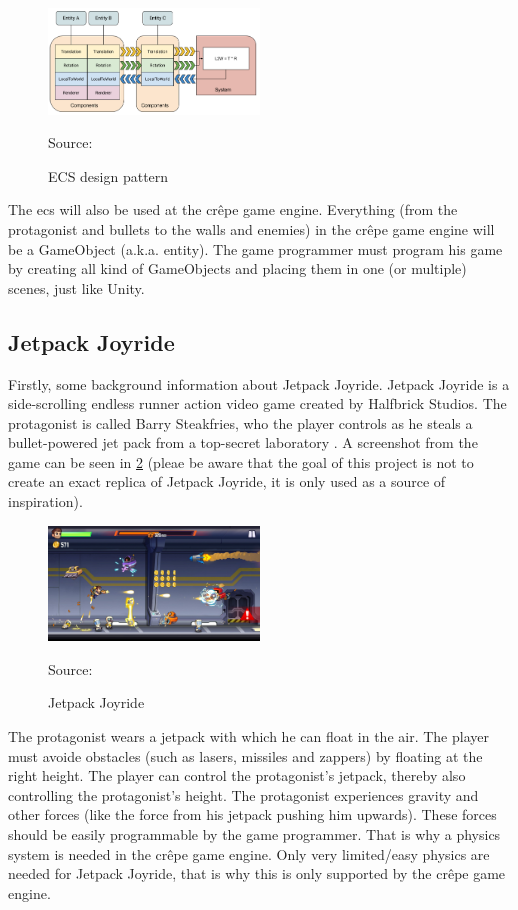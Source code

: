 \documentclass{projdoc}
\begin{document}
\begin{figure}
	\centering
	\includegraphics[width=0.5\textwidth]{img/ECSBlockDiagram.png}
	\caption{ECS design pattern}
	Source: \autocite{img:ECSBlockDiagram}
	\label{fig:ECS Block Diagram}
\end{figure}

The \gls{ecs} will also be used at the cr\^epe game engine. Everything (from the
protagonist and bullets to the walls and enemies) in the cr\^epe game engine will
be a GameObject (a.k.a. entity). The game programmer must program his game by
creating all kind of GameObjects and placing them in one (or multiple) scenes, just
like Unity.

\subsection{Jetpack Joyride}
Firstly, some background information about Jetpack Joyride. Jetpack Joyride is a
side-scrolling endless runner action video game created by Halfbrick Studios. The
protagonist is called Barry Steakfries, who the player controls as he steals a
bullet-powered jet pack from a top-secret laboratory \autocite{wiki:JetpackJoyride}.
A screenshot from the game can be seen in \cref{fig:JetpackJoyride} (pleae be
aware that the goal of this project is not to create an exact replica of Jetpack
Joyride, it is only used as a source of inspiration).

\begin{figure}
	\centering
	\includegraphics[width=0.5\textwidth]{img/JetpackJoyride.jpg}
	\caption{Jetpack Joyride}
	Source: \autocite{img:JetpackJoyride}
	\label{fig:JetpackJoyride}
\end{figure}

The protagonist wears a jetpack with which he can float in the air. The player must
avoide obstacles (such as lasers, missiles and zappers) by floating at the right
height. The player can control the protagonist's jetpack, thereby also controlling
the protagonist's height. The protagonist experiences gravity and other forces (like
the force from his jetpack pushing him upwards). These forces should be easily
programmable by the game programmer. That is why a physics system is needed in the
cr\^epe game engine. Only very limited/easy physics are needed for Jetpack Joyride,
that is why this is only supported by the cr\^epe game engine.
\end{document}
